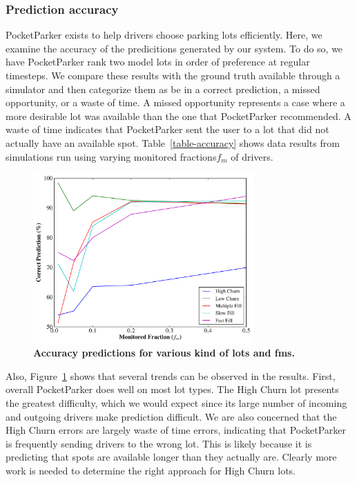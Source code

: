 \subsubsection{Prediction accuracy}




PocketParker exists to help drivers choose parking lots efficiently. Here,
we examine the accuracy of the predicitions generated by our system. To do
so, we have PocketParker rank two model lots in order of preference at
regular timesteps.  We compare these results with the ground truth available
through a simulator and then categorize them as be in a correct prediction,
a missed opportunity, or a waste of time. A missed opportunity represents a
case where a more desirable lot was available than the one that PocketParker
recommended. A waste of time indicates that PocketParker sent the user to a
lot that did not actually have an available spot. Table~\ref{table-accuracy}
shows data results from simulations run using varying monitored
fractions$f_m$ of drivers.

\begin{figure}[t]
\centering
\includegraphics[width=3.325in]{./simulator/figures/accuracy_graph.pdf}

\caption{\textbf{Accuracy predictions for various kind of lots and fms.} }
\label{fig-accuracy}
\end{figure}

Also, Figure~\ref{fig-accuracy} shows that several trends can be observed 
in the results. First, overall PocketParker does well on most lot types. 
The High Churn lot presents the greatest difficulty, which we would expect 
since its large number of incoming and outgoing drivers make prediction 
difficult. We are also concerned that the High Churn errors are largely 
waste of time errors, indicating that PocketParker is frequently sending 
drivers to the wrong lot.  This is likely because it is predicting that 
spots are available longer than they actually are. Clearly more work is 
needed to determine the right approach for High Churn lots.

